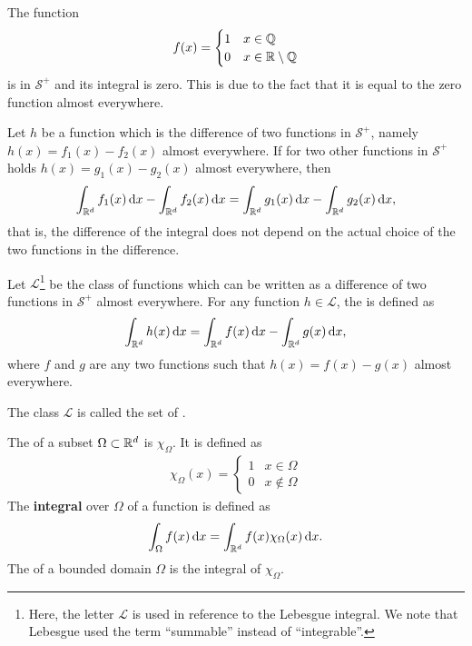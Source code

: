 \begin{example}
  The function
  \begin{gather*}
    f(x) =
    \begin{cases}
      1 & x\in \mathbb Q \\
      0 & x\in \mathbb R\setminus \mathbb Q
    \end{cases}
  \end{gather*}
  is in $\mathcal S^+$ and its integral is zero. This is due to the fact that
  it is equal to the zero function almost everywhere.
\end{example}

\begin{lemma}
  Let $h$ be a function which is the difference of two functions in
  $\mathcal S^+$, namely $h(x) = f_1(x)-f_2(x)$ almost everywhere. If
  for two other functions in $\mathcal S^+$ holds $h(x) =
  g_1(x)-g_2(x)$ almost everywhere, then
  \begin{gather}
    \label{eq:integral:2}
    \int_{\mathbb R^d} f_1(x)\,\mathrm{d} x
    -\int_{\mathbb R^d} f_2(x)\,\mathrm{d} x
    =\int_{\mathbb R^d} g_1(x)\,\mathrm{d} x
    -\int_{\mathbb R^d} g_2(x)\,\mathrm{d} x,
  \end{gather}
  that is, the difference of the integral does not depend on the
  actual choice of the two functions in the difference.
\end{lemma}

\begin{definition}
  Let $\mathcal L$\footnote{Here, the letter $\mathcal L$ is used in
    reference to the Lebesgue integral. We note that Lebesgue used the
    term ``summable'' instead of ``integrable''.} be the class of
  functions which can be written as a difference of two functions in
  $\mathcal S^+$ almost everywhere. For any function $h\in \mathcal
  L$, the  is defined as
  \begin{gather*}
    \int_{\mathbb R^d} h(x)\,\mathrm{d} x = \int_{\mathbb R^d} f(x)\,\mathrm{d} x - \int_{\mathbb R^d} g(x)\,\mathrm{d} x,
  \end{gather*}
  where $f$ and $g$ are any two functions such that $h(x) = f(x) -
  g(x)$ almost everywhere.
  
  The class $\mathcal L$ is called the set of .
\end{definition}

\begin{definition}
  The  of a subset $\Omega\subset\mathbb R^d$ is
  $\chi_{\Omega}$. It is defined as
  \begin{gather*}
    \chi_{\Omega}(x) =
    \begin{cases}
      1 & x\in \Omega \\
      0 & x\not\in \Omega
    \end{cases}
  \end{gather*}
  The \textbf{integral} over $\Omega$ of a function is defined as
  \begin{gather*}
    \int_\Omega f(x)\,\mathrm{d} x = \int_{\mathbb R^d} f(x) \chi_\Omega(x)\,\mathrm{d} x.
  \end{gather*}
  The  of a bounded domain $\Omega$ is the integral of
  $\chi_\Omega$.
\end{definition}

